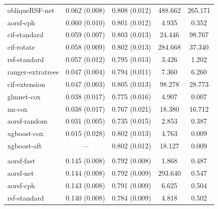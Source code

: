 \documentclass[twoside,11pt]{article}\usepackage[]{graphicx}\usepackage[]{xcolor}
\newenvironment{knitrout}{}{} %
\begin{document}
\begin{knitrout}
\begin{longtable}[t]{lcccc}
\hspace{1em}obliqueRSF-net & 0.062 (0.008) & 0.808 (0.012) & 488.662 & 265.171\\
\hspace{1em}aorsf-cph & 0.060 (0.010) & 0.801 (0.012) & 4.935 & 0.352\\
\hspace{1em}cif-standard & 0.059 (0.007) & 0.803 (0.013) & 24.446 & 98.767\\
\hspace{1em}cif-rotate & 0.058 (0.009) & 0.802 (0.013) & 284.668 & 37.340\\
\hspace{1em}rsf-standard & 0.057 (0.012) & 0.795 (0.013) & 3.426 & 1.202\\
\hspace{1em}ranger-extratrees & 0.047 (0.004) & 0.794 (0.011) & 7.360 & 6.260\\
\hspace{1em}cif-extension & 0.047 (0.003) & 0.805 (0.013) & 98.278 & 28.773\\
\hspace{1em}glmnet-cox & 0.038 (0.017) & 0.775 (0.016) & 4.907 & 0.007\\
\hspace{1em}nn-cox & 0.038 (0.017) & 0.767 (0.021) & 18.380 & 16.712\\
\hspace{1em}aorsf-random & 0.031 (0.005) & 0.735 (0.015) & 2.853 & 0.387\\
\hspace{1em}xgboost-cox & 0.015 (0.028) & 0.802 (0.013) & 4.763 & 0.009\\
\hspace{1em}xgboost-aft & --- & 0.802 (0.012) & 18.127 & 0.009\\
\addlinespace[0.3em]
\multicolumn{5}{l}{\textit{\textbf{MESA; death, n = 6793, p = 48}}}\\
\hline
\hspace{1em}aorsf-fast & 0.145 (0.008) & 0.792 (0.008) & 1.868 & 0.487\\
\hspace{1em}aorsf-net & 0.144 (0.008) & 0.792 (0.009) & 293.640 & 0.547\\
\hspace{1em}aorsf-cph & 0.143 (0.008) & 0.791 (0.009) & 6.625 & 0.504\\
\hspace{1em}rsf-standard & 0.140 (0.008) & 0.784 (0.009) & 4.818 & 0.502\\

\end{longtable}
\end{knitrout}
\end{document}
